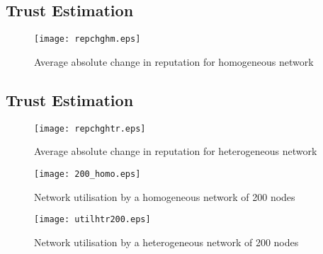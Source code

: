 \documentclass{IEEEtran}
\begin{document}
\subsection{Trust Estimation}
\begin{figure}[!t]
\begin{center}
\texttt{[image: repchghm.eps]}
\caption{Average absolute change in reputation for homogeneous network}
\label{fig:changerephomo}
\end{center}
\end{figure}

\subsection{Trust Estimation}
\begin{figure}[!t]
\begin{center}
\texttt{[image: repchghtr.eps]}
\caption{Average absolute change in reputation for heterogeneous network}
\label{fig:changerephtr}
\end{center}
\end{figure}

\begin{figure}[!t]
\begin{center}
\texttt{[image: 200\_homo.eps]}
\caption{Network utilisation by a homogeneous network of 200 nodes}
\label{fig:networkutilhomo}
\end{center}
\end{figure}

\begin{figure}[!t]
\begin{center}
\texttt{[image: utilhtr200.eps]}
\caption{Network utilisation by a heterogeneous network of 200 nodes}
\label{fig:networkutilhtr}
\end{center}
\end{figure}
\end{document}
